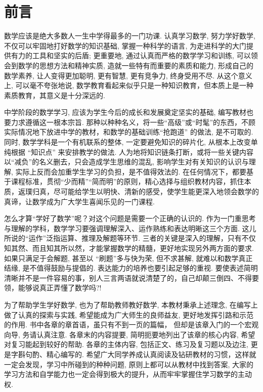 \documentclass[10pt]{article}
\begin{document}
\section*{前言}

数学应该是绝大多数人一生中学得最多的一门功课. 认真学习数学, 努力学好数学, 不仅可以牢固地打好数学的知识基础, 掌握一种科学的语言, 为走进科学的大门提供有力的工具和坚实的后盾; 更重要地, 通过认真而严格的数学学习和训练, 可以领会到数学的思想方法和精神实质, 造就一些特有而重要的素质和能力, 形成自己的数学素养, 让人变得更加聪明, 更有智慧, 更有竞争力, 终身受用不尽. 从这个意义上, 可以毫不夸张地说, 数学教育看起来似乎只是一种知识教育，但本质上是一种素质教育，其意义是十分深远的.

中学阶段的数学学习, 应该为学生今后的成长和发展奠定坚实的基础, 编写教材也要力求遵循这一根本宗旨. 那种以种种名义，将一些“高级”或“时髦”的东西，不顾实际情况地下放进中学的教材，和数学的基础训练“抢跑道” 的做法, 是不可取的. 同时, 数学学科是一个有机联系的整体, 一定要避免知识的碎片化, 从根本上改变单纯根据 “知识点” 来安排教学的做法. 人为地将知识链条打断，或将一些关键内容以“减负”的名义删去，只会造成学生思维的混乱, 影响学生对有关知识的认识与理解, 实际上反而会加重学生学习的负担，是不值得效法的. 在任何情况下，都要基于课程标准，贯彻“少而精”“简而明”的原则，精心选择与组织教材内容，抓住本质，返璞归真，尽可能给学生以明快、清新的感受，使学生能更深入地领会数学的真谛，让数学成为广大学生喜闻乐见的一门课程.

怎么才算“学好了数学”呢？对这个问题是需要一个正确的认识的. 作为一门重思考与理解的学科，数学学习要强调理解深入、运作熟练和表达明晰这三个方面. 这儿所说的“运作”泛指运算、推理及解题等环节. 三者的关键是深入的理解，只有不仅知其然、而且知其所以然，才能掌握数学的精髓，更好地实现另外两方面的要求. 如果只满足于会解题, 甚至以 “刷题”多与快为荣, 但不求甚解, 就难以和数学真正结缘, 是不值得鼓励与提倡的. 表达能力的培养也要引起足够的重视. 要使表述简明清晰并不是一件容易的事，别人三言两语就说清楚了的，自己却颠三倒四、不得要领，能够说真正弄懂了数学吗?!

为了帮助学生学好数学, 也为了帮助教师教好数学, 本教材秉承上述理念, 在编写上做了认真的探索与实践, 希望能成为广大师生的良师益友, 更好地发挥引路和示范的作用. 书中各章的章首语，虽只有不到一页的篇幅， 但却是该章入门的一个宏观向导, 务请认真注意. 各章末的内容提要, 简明扼要地列出了该章的核心内容, 希望对复习能起到较好的帮助. 各章的主体内容, 包括正文、练习及复习题以及边注, 更是字斟句酌、精心编写的. 希望广大同学养成认真阅读及钻研教材的习惯，这样就一定会发现，学习中所碰到的种种问题, 原则上都可以从教材中找到答案, 大家的学习方法和自学能力也一定会得到极大的提升，从而牢牢掌握住学习数学的主动权.
\end{document}
